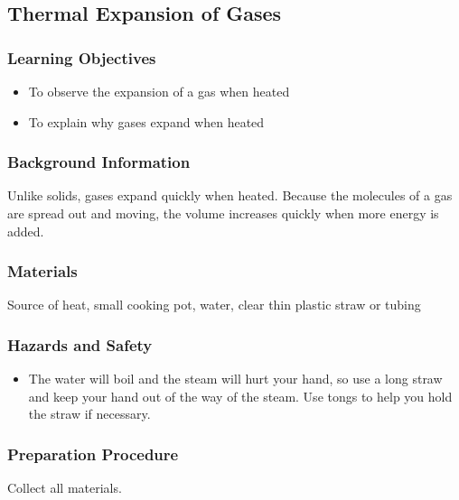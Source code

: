 \subsection{Thermal Expansion of Gases}

\subsubsection*{Learning Objectives}
\begin{itemize}
\item{To observe the expansion of a gas when heated} 
\item{To explain why gases expand when heated} 
\end{itemize}

\subsubsection*{Background Information}
Unlike solids, gases expand quickly when heated. Because the molecules of a gas are spread out and moving, the volume increases quickly when more energy is added.  

\subsubsection*{Materials}
Source of heat, small cooking pot, water, clear thin plastic straw or tubing

\subsubsection*{Hazards and Safety}
\begin{itemize}
\item{The water will boil and the steam will hurt your hand, so use a long straw and keep your hand out of the way of the steam. Use tongs to help you hold the straw if necessary.} 
\end{itemize}

\subsubsection*{Preparation Procedure}
Collect all materials.

